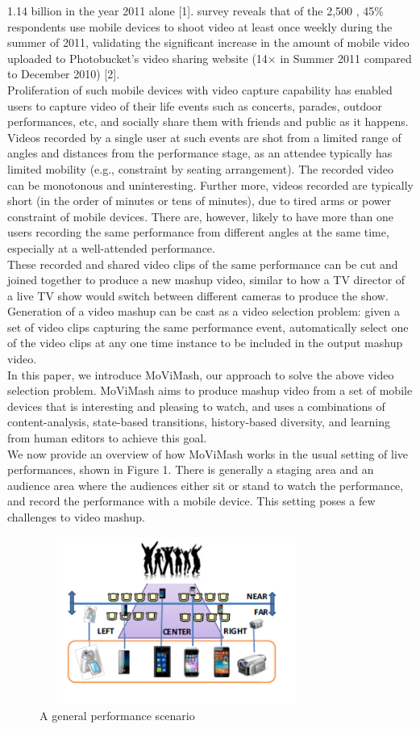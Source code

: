 \documentclass{sig-alternate}
\begin{document}
1.14 billion in the year 2011 alone [1]. survey reveals that of the  2,500 , 45\% respondents  use mobile devices to shoot video at least once weekly
during the summer of 2011, validating the significant increase in
the amount of mobile video uploaded to Photobucket’s video sharing website (14× in Summer 2011 compared to December 2010) [2].\\
Proliferation of such mobile devices with video capture capability has enabled users to capture video of their life events such
as concerts, parades, outdoor performances, etc, and socially share
them with friends and public as it happens. Videos recorded by
a single user at such events are shot from a limited range of angles and distances from the performance stage, as an attendee typically has limited mobility (e.g., constraint by seating arrangement).
The recorded video can be monotonous and uninteresting. Further more, videos recorded are typically short (in the order of minutes
or tens of minutes), due to tired arms or power constraint of mobile
devices. There are, however, likely to have more than one users
recording the same performance from different angles at the same
time, especially at a well-attended performance.\\
These recorded and shared video clips of the same performance
can be cut and joined together to produce a new mashup video,
similar to how a TV director of a live TV show would switch between different cameras to produce the show. Generation of a video
mashup can be cast as a video selection problem: given a set of
video clips capturing the same performance event, automatically
select one of the video clips at any one time instance to be included
in the output mashup video.\\
In this paper, we introduce MoViMash, our approach to solve
the above video selection problem. MoViMash aims to produce
mashup video from a set of mobile devices that is interesting and
pleasing to watch, and uses a combinations of content-analysis,
state-based transitions, history-based diversity, and learning from
human editors to achieve this goal.\\
We now provide an overview of how MoViMash works in the
usual setting of live performances, shown in Figure 1. There is
generally a staging area and an audience area where the audiences
either sit or stand to watch the performance, and record the performance with a mobile device. This setting poses a few challenges to
video mashup.\\
\begin{figure}[h!]
  
  \includegraphics[width=9cm, height=5.5cm]{video_5.pdf}
\caption{A general performance scenario}
\end{figure}
\end{document}

